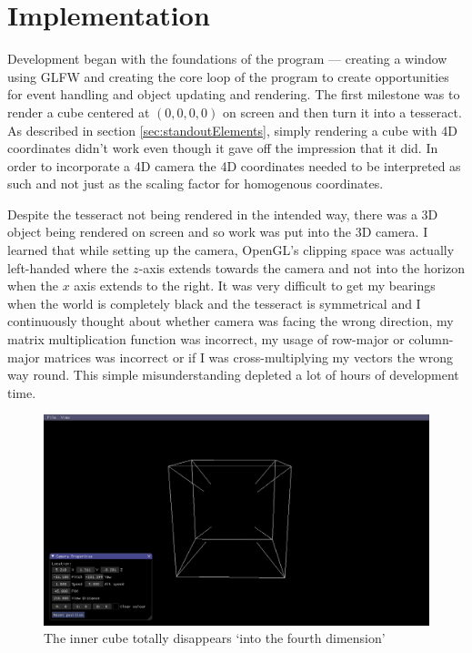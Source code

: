 \documentclass[11pt, a4paper]{article}
\begin{document}
\section{Implementation}

Development began with the foundations of the program --- creating a window using GLFW and creating the core loop of the program to create opportunities for event handling and object updating and rendering. The first milestone was to render a cube centered at $(0, 0, 0, 0)$ on screen and then turn it into a tesseract. As described in section \ref{sec:standoutElements}, simply rendering a cube with 4D coordinates didn't work even though it gave off the impression that it did. In order to incorporate a 4D camera the 4D coordinates needed to be interpreted as such and not just as the scaling factor for homogenous coordinates.

Despite the tesseract not being rendered in the intended way, there was a 3D object being rendered on screen and so work was put into the 3D camera. I learned that while setting up the camera, OpenGL's clipping space was actually left-handed where the $z$-axis extends towards the camera and not into the horizon when the $x$ axis extends to the right. It was very difficult to get my bearings when the world is completely black and the tesseract is symmetrical and I continuously thought about whether camera was facing the wrong direction, my matrix multiplication function was incorrect, my usage of row-major or column-major matrices was incorrect or if I was cross-multiplying my vectors the wrong way round. This simple misunderstanding depleted a lot of hours of development time.

\begin{figure}[!h]
  \centering
  \includegraphics[width=\textwidth]{img/centered_4D_cube.png}
  \caption{The inner cube totally disappears `into the fourth dimension'}
  \label{fig:incorrectCamera}
\end{figure}
\end{document}
